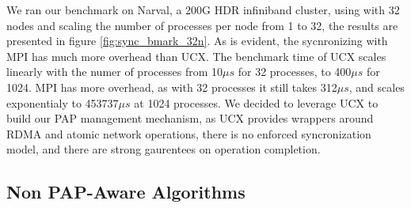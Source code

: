 We ran our benchmark on Narval, a 200G HDR infiniband cluster, using with 32 nodes and scaling the number of processes per node from 1 to 32, the results are presented in figure \ref{fig:sync_bmark_32n}.
As is evident, the sycnronizing with MPI has much more overhead than UCX.
The benchmark time of UCX scales linearly with the numer of processes from 10$\mu s$ for 32 processes, to 400$\mu s$ for 1024.
MPI has more overhead, as with 32 processes it still takes 312$\mu s$, and scales exponentialy to 453737$\mu s$ at 1024 processes.
We decided to leverage UCX to build our PAP management mechanism, as UCX provides wrappers around RDMA and atomic network operations, there is no enforced syncronization model, and there are strong gaurentees on operation completion. 


\lstset{style = bklstc}
\lstset{label = lst:mpi_sync_bmark}
\lstset{caption = Benchmark to evaluate overhead of MPI for one-sided operations}


\lstset{label = lst:ucx_sync_bmark}
\lstset{caption = Benchmark to evaluate overhead of UCX for one-sided operations}




\subsection{Non PAP-Aware Algorithms}

